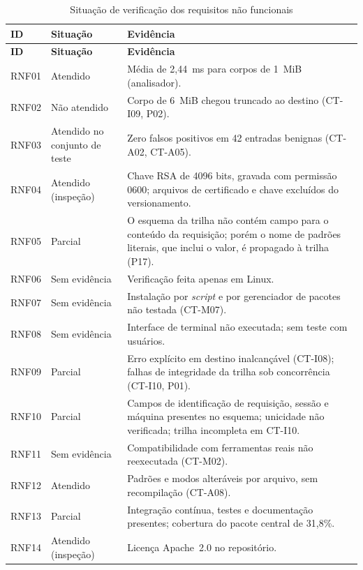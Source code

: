 {\small
\begin{longtable}{|p{1.3cm}|p{3.0cm}|p{10.0cm}|}
\caption{Situação de verificação dos requisitos não funcionais}\label{tab:sit_rnf}\\
\hline
\textbf{ID} & \textbf{Situação} & \textbf{Evidência} \\ \hline
\endfirsthead
\hline
\textbf{ID} & \textbf{Situação} & \textbf{Evidência} \\ \hline
\endhead
RNF01 & Atendido & Média de 2,44~ms para corpos de 1~MiB (analisador). \\ \hline
RNF02 & Não atendido & Corpo de 6~MiB chegou truncado ao destino (CT-I09, P02). \\ \hline
RNF03 & Atendido no conjunto de teste & Zero falsos positivos em 42 entradas benignas (CT-A02, CT-A05). \\ \hline
RNF04 & Atendido (inspeção) & Chave RSA de 4096 bits, gravada com permissão 0600; arquivos de certificado e chave excluídos do versionamento. \\ \hline
RNF05 & Parcial & O esquema da trilha não contém campo para o conteúdo da requisição; porém o nome de padrões literais, que inclui o valor, é propagado à trilha (P17). \\ \hline
RNF06 & Sem evidência & Verificação feita apenas em Linux. \\ \hline
RNF07 & Sem evidência & Instalação por \textit{script} e por gerenciador de pacotes não testada (CT-M07). \\ \hline
RNF08 & Sem evidência & Interface de terminal não executada; sem teste com usuários. \\ \hline
RNF09 & Parcial & Erro explícito em destino inalcançável (CT-I08); falhas de integridade da trilha sob concorrência (CT-I10, P01). \\ \hline
RNF10 & Parcial & Campos de identificação de requisição, sessão e máquina presentes no esquema; unicidade não verificada; trilha incompleta em CT-I10. \\ \hline
RNF11 & Sem evidência & Compatibilidade com ferramentas reais não reexecutada (CT-M02). \\ \hline
RNF12 & Atendido & Padrões e modos alteráveis por arquivo, sem recompilação (CT-A08). \\ \hline
RNF13 & Parcial & Integração contínua, testes e documentação presentes; cobertura do pacote central de 31,8\%. \\ \hline
RNF14 & Atendido (inspeção) & Licença Apache~2.0 no repositório. \\ \hline
\end{longtable}
}
\noindent{}

